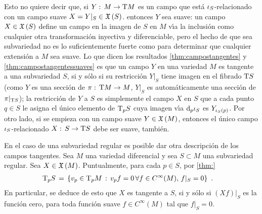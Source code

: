 Esto no quiere decir que, si $Y:\,M\rightarrow\tangente{M}$ es un campo
que est\'{a} $\inc[S]$-relacionado con un campo suave $X=Y|_{S}\in\champs{S}$.
entonces $Y$ sea suave: un campo $X\in\champs{S}$ define un
campo en la imagen de $S$ en $M$ v\'{\i}a la inclusi\'{o}n como
cualquier otra transformaci\'{o}n inyectiva y diferenciable, pero el hecho
de que sea subvariedad no es lo suficientemente fuerte como para determinar
que cualquier extensi\'{o}n a $M$ sea suave. Lo que dicen los
resultados \ref{thm:campostangentes} y \ref{thm:campostangentessuaves} es que
un campo $Y$ en una variedad $M$ es tangente a una subvariedad $S$, si y
s\'{o}lo si su restricci\'{o}n $Y|_{S}$ tiene imagen en el fibrado
$\tangente{S}$ (como $Y$ es una secci\'{o}n de
$\pi:\,\tangente{M}\rightarrow M$, $Y|_{S}$ es autom\'{a}ticamente una
secci\'{o}n de $\pi|_{\tangente{S}}$); la restricci\'{o}n de $Y$ a $S$ es
simplemente el campo $X$ en $S$ que a cada punto $q\in S$ le asigna el
\'{u}nico elemento de $\tangente[p]{S}$ cuya imagen v\'{\i}a
$\diferencial[p]{\inc[S]}$ es $Y_{{\inc[S]}(p)}$. Por otro lado, si se
empieza con un campo suave $Y\in\champs{M}$, entonces el \'{u}nico campo
$\inc[S]$-relacionado $X:\,S\rightarrow\tangente{S}$ debe ser suave,
tambi\'{e}n.

\begin{obsTangenteSubvarReg}\label{obs:tangentesubvarreg}
	En el caso de una subvariedad regular es posible dar otra
	descripci\'{o}n de los campos tangentes. Sea $M$ una variedad
	diferencial y sea $S\subset M$ una subvariedad regular. Sea
	$X\in\champs{M}$. Puntualmente, para cada $p\in S$,
	por \ref{thm:}
	\begin{align*}
		\tangente[p]{S} & \,=\,\left\lbrace
			v_{p}\in\tangente[p]{M}\,:\,
			v_{p}f=0\,\forall f\in C^{\infty}(M),\,f|_{S}=0
			\right\rbrace
		\text{ .}
	\end{align*}
	En particular, se deduce de esto que $X$ es tangente a $S$, si
	y s\'{o}lo si $(Xf)|_{S}$ es la funci\'{o}n cero, para toda
	funci\'{o}n suave $f\in C^{\infty}(M)$ tal que $f|_{S}=0$.
\end{obsTangenteSubvarReg}


